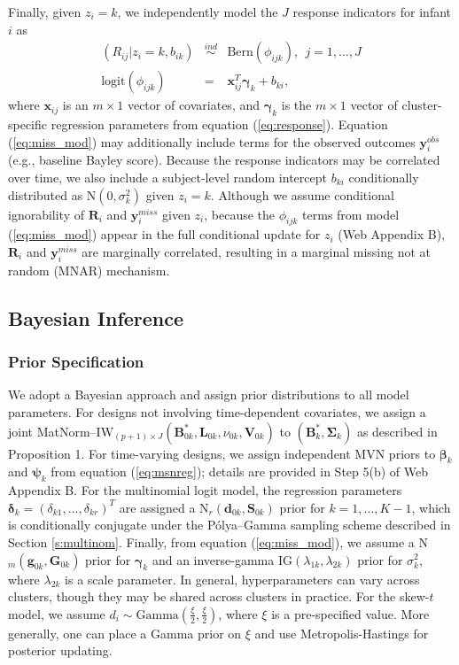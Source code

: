 \documentclass[useAMS,usenatbib,referee]{biom}
\begin{document}
Finally, given $z_i=k$, we independently model the $J$ response indicators for infant $i$ as
\begin{eqnarray}
	\label{eq:miss_mod}
(R_{ij}|z_i=k,b_{ik})&\stackrel{ind}{\sim}&\text{Bern}(\phi_{ijk}),~~j=1,\ldots,J\nonumber\\
\text{logit}(\phi_{ijk})&=&\mathbf{x}^T_{ij}\boldsymbol\gamma_k+b_{ki},
\end{eqnarray}
where $\mathbf{x}_{ij}$ is an $m\times 1$ vector of covariates, and $\boldsymbol\gamma_k$ is the $m\times 1$ vector of cluster-specific regression parameters from equation (\ref{eq:response}). Equation (\ref{eq:miss_mod}) may additionally include terms for the observed outcomes $\mathbf{y}^{obs}_i$ (e.g., baseline Bayley score). Because the response indicators may be correlated over time, we also include a subject-level random intercept $b_{ki}$ conditionally distributed as N$(0,\sigma^2_k)$ given $z_i=k$. Although we assume conditional ignorability of $\mathbf{R}_i$ and $\mathbf{y}^{miss}_i$ given $z_i$, because the $\phi_{ijk}$ terms from model (\ref{eq:miss_mod}) appear in the full conditional update for $z_i$ (Web Appendix B), $\mathbf{R}_i$ and $\mathbf{y}^{miss}_i$ are marginally correlated, resulting in a marginal missing not at random (MNAR) mechanism.

\subsection{Bayesian Inference}
\label{s:bayesinf}
\subsubsection{Prior Specification}
\label{s:priors}
We adopt a Bayesian approach and assign prior distributions to all model parameters. For designs not involving time-dependent covariates, we assign a joint MatNorm--IW$_{(p+1)\times J}(\mathbf{B}^*_{0k},\mathbf{L}_{0k},\nu_{0k},\mathbf{V}_{0k})$ to $(\mathbf{B}^*_k,\boldsymbol\Sigma_k)$ as described in Proposition 1. For time-varying designs, we assign independent MVN priors to $\boldsymbol\beta_k$ and $\boldsymbol\psi_k$ from equation (\ref{eq:msnreg}); details are provided in Step 5(b) of Web Appendix B. For the multinomial logit model, the regression parameters $\boldsymbol\delta_k = (\delta_{k1},...,\delta_{kr})^T$ are assigned a $\text{N}_r(\mathbf{d}_{0k}, \mathbf{S}_{0k})$ prior for $k = 1,...,K-1$, which is conditionally conjugate under the P\'olya--Gamma sampling scheme described in Section \ref{s:multinom}. Finally, from equation (\ref{eq:miss_mod}), we assume a N$_m(\mathbf{g}_{0k},\mathbf{G}_{0k})$ prior for $\boldsymbol\gamma_k$ and an inverse-gamma IG$(\lambda_{1k},\lambda_{2k})$ prior for $\sigma^2_k$, where $\lambda_{2k}$ is a scale parameter. In general, hyperparameters can vary across clusters, though they may be shared across clusters in practice. For the skew-$t$ model, we assume $d_i \sim \text{Gamma} \left (\frac{\xi}{2},\frac{\xi}{2} \right )$, where $\xi$ is a pre-specified value. More generally, one can place a Gamma prior on $\xi$ and use Metropolis-Hastings for posterior updating.
\end{document}
